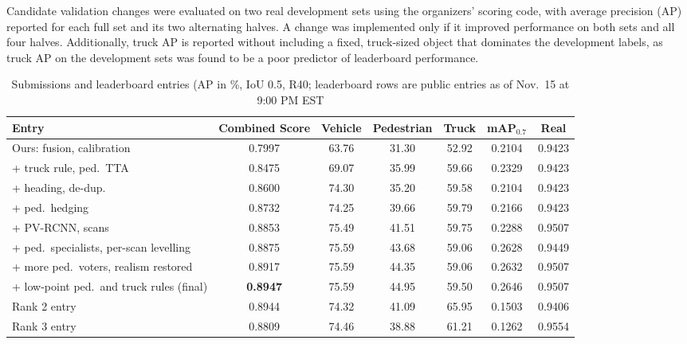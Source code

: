 \documentclass[conference]{IEEEtran}
\begin{document}
Candidate validation changes were evaluated on two real development sets using the organizers' scoring code, with average precision (AP) reported for each full set and its two alternating halves. A change was implemented only if it improved performance on both sets and all four halves. Additionally, truck AP is reported without including a fixed, truck-sized object that dominates the development labels, as truck AP on the development sets was found to be a poor predictor of leaderboard performance.
\begin{table}[!t]
\caption{Submissions and leaderboard entries (AP in \%, IoU 0.5, R40; leaderboard rows are public entries as of Nov.\ 15 at 9:00 PM EST}
\label{tab:submissions}
\centering
\small
\begin{tabular}{lcccccc}
\toprule
Entry & Combined Score & Vehicle & Pedestrian & Truck & mAP$_{0.7}$ & Real \\
\midrule
Ours: fusion, calibration                      & 0.7997 & 63.76 & 31.30 & 52.92 & 0.2104 & 0.9423 \\
\quad + truck rule, ped.\ TTA                  & 0.8475 & 69.07 & 35.99 & 59.66 & 0.2329 & 0.9423 \\
\quad + heading, de-dup.                       & 0.8600 & 74.30 & 35.20 & 59.58 & 0.2104 & 0.9423 \\
\quad + ped.\ hedging                          & 0.8732 & 74.25 & 39.66 & 59.79 & 0.2166 & 0.9423 \\
\quad + PV-RCNN, scans                         & 0.8853 & 75.49 & 41.51 & 59.75 & 0.2288 & 0.9507 \\
\quad + ped.\ specialists, per-scan levelling  & 0.8875 & 75.59 & 43.68 & 59.06 & 0.2628 & 0.9449 \\
\quad + more ped.\ voters, realism restored    & 0.8917 & 75.59 & 44.35 & 59.06 & 0.2632 & 0.9507 \\
\quad + low-point ped.\ and truck rules (final) & \textbf{0.8947} & 75.59 & 44.95 & 59.50 & 0.2646 & 0.9507 \\
\midrule
Rank 2 entry                                   & 0.8944 & 74.32 & 41.09 & 65.95 & 0.1503 & 0.9406 \\
Rank 3 entry                                   & 0.8809 & 74.46 & 38.88 & 61.21 & 0.1262 & 0.9554 \\
\bottomrule
\end{tabular}
\end{table}
\end{document}
